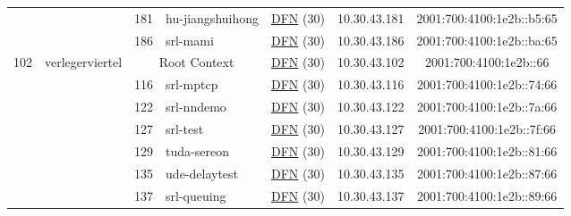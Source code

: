 \begin{small}
\begin{center}
\begin{longtable}{|c|c|c|c|c|c|c|c|}
  &  & \tiny{181} & \multicolumn{1}{|l|}{\tiny{hu-jiangshuihong}} & \multicolumn{2}{|c|}{\tiny{\href{https://www.dfn.de}{DFN} (30)}} & \tiny{10.30.43.181} & \tiny{2001:700:4100:1e2b::b5:65} \\* \cline{3-3}\cline{4-4}\cline{5-5}\cline{6-6}\cline{7-7}\cline{8-8}
  &  & \tiny{186} & \multicolumn{1}{|l|}{\tiny{srl-mami}} & \multicolumn{2}{|c|}{\tiny{\href{https://www.dfn.de}{DFN} (30)}} & \tiny{10.30.43.186} & \tiny{2001:700:4100:1e2b::ba:65} \\ \hline
 \multirow{17}{*}{\tiny{102}} & \multicolumn{1}{|l|}{\multirow{17}{*}{\tiny{verlegerviertel}}} & \multicolumn{2}{|c|}{\tiny{Root Context}} & \multicolumn{2}{|c|}{\tiny{\href{https://www.dfn.de}{DFN} (30)}} & \tiny{10.30.43.102} & \tiny{2001:700:4100:1e2b::66} \\* \cline{3-3}\cline{4-4}\cline{5-5}\cline{6-6}\cline{7-7}\cline{8-8}
  &  & \tiny{116} & \multicolumn{1}{|l|}{\tiny{srl-mptcp}} & \multicolumn{2}{|c|}{\tiny{\href{https://www.dfn.de}{DFN} (30)}} & \tiny{10.30.43.116} & \tiny{2001:700:4100:1e2b::74:66} \\* \cline{3-3}\cline{4-4}\cline{5-5}\cline{6-6}\cline{7-7}\cline{8-8}
  &  & \tiny{122} & \multicolumn{1}{|l|}{\tiny{srl-nndemo}} & \multicolumn{2}{|c|}{\tiny{\href{https://www.dfn.de}{DFN} (30)}} & \tiny{10.30.43.122} & \tiny{2001:700:4100:1e2b::7a:66} \\* \cline{3-3}\cline{4-4}\cline{5-5}\cline{6-6}\cline{7-7}\cline{8-8}
  &  & \tiny{127} & \multicolumn{1}{|l|}{\tiny{srl-test}} & \multicolumn{2}{|c|}{\tiny{\href{https://www.dfn.de}{DFN} (30)}} & \tiny{10.30.43.127} & \tiny{2001:700:4100:1e2b::7f:66} \\* \cline{3-3}\cline{4-4}\cline{5-5}\cline{6-6}\cline{7-7}\cline{8-8}
  &  & \tiny{129} & \multicolumn{1}{|l|}{\tiny{tuda-sereon}} & \multicolumn{2}{|c|}{\tiny{\href{https://www.dfn.de}{DFN} (30)}} & \tiny{10.30.43.129} & \tiny{2001:700:4100:1e2b::81:66} \\* \cline{3-3}\cline{4-4}\cline{5-5}\cline{6-6}\cline{7-7}\cline{8-8}
  &  & \tiny{135} & \multicolumn{1}{|l|}{\tiny{ude-delaytest}} & \multicolumn{2}{|c|}{\tiny{\href{https://www.dfn.de}{DFN} (30)}} & \tiny{10.30.43.135} & \tiny{2001:700:4100:1e2b::87:66} \\* \cline{3-3}\cline{4-4}\cline{5-5}\cline{6-6}\cline{7-7}\cline{8-8}
  &  & \tiny{137} & \multicolumn{1}{|l|}{\tiny{srl-queuing}} & \multicolumn{2}{|c|}{\tiny{\href{https://www.dfn.de}{DFN} (30)}} & \tiny{10.30.43.137} & \tiny{2001:700:4100:1e2b::89:66} \\* \cline{3-3}\cline{4-4}\cline{5-5}\cline{6-6}\cline{7-7}\cline{8-8}

\end{longtable}
\end{center}
\end{small}

